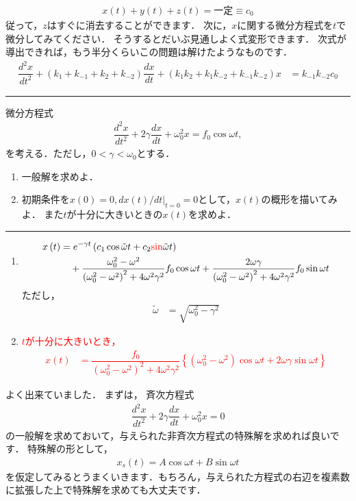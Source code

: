 \documentclass[11pt,a4]{jsarticle}
\numberwithin{equation}{section}
\begin{document}
\begin{align*}
  x(t) + y(t) + z(t) = 一定 \equiv c_0 
\end{align*}
従って，$z$はすぐに消去することができます．
次に，$x$に関する微分方程式を$t$で微分してみてください．
そうするとだいぶ見通しよく式変形できます．
次式が導出できれば，もう半分くらいこの問題は解けたようなものです．
\begin{align}
\dfrac{d^{2}x}{dt^{2}}+\left(k_{1}+k_{-1}+k_{2}+k_{-2}\right)\dfrac{dx}{dt}+\left(k_{1}k_{2}+k_{1}k_{-2}+k_{-1}k_{-2}\right)x & =k_{-1}k_{-2}c_{0}
\end{align}
%
\newpage
%
\hrule
\enshu
微分方程式
\begin{align*}
 \dfrac{d^2x}{dt^2} + 2\gamma \dfrac{dx}{dt} + \omega_{0}^{2}x = f_0 \cos \omega t, 
\end{align*}
を考える．ただし，$0< \gamma < \omega_{0}$とする．
\begin{enumerate}[(1)]
  \item 一般解を求めよ．
  \item 初期条件を$x(0)=0, d x(t)/dt|_{t=0}=0$として，$x(t)$の概形を描いてみよ．
	また$t$が十分に大きいときの$x(t)$を求めよ．
\end{enumerate}
%
\hrule
\vspace*{.2cm}
%
\begin{enumerate}[(1)]
 \item
\begin{align*}
 x\left(t\right) & =e^{-\gamma t}\left(c_{1}\cos\tilde{\omega}t+c_{2}\textcolor{red}{\sin}\tilde{\omega}t\right)\\
 & \quad+\dfrac{\omega_{0}^{2}-\omega^{2}}{\left(\omega_{0}^{2}-\omega^{2}\right)^{2}+4\omega^{2}\gamma^{2}}f_{0}\cos\omega t+\dfrac{2\omega\gamma}{\left(\omega_{0}^{2}-\omega^{2}\right)^{2}+4\omega^{2}\gamma^{2}}f_{0}\sin\omega t
\end{align*}
ただし，
\begin{align*}
 \tilde{\omega}&=\sqrt{\omega_{0}^{2}-\gamma^{2}}  
\end{align*}
%
\item

\textcolor{red}{
$t$が十分に大きいとき，
\begin{align*}
x\left(t\right) & =
 \dfrac{f_{0}}{\left(\omega_{0}^{2}-\omega^{2}\right)^{2}+4\omega^{2}\gamma^{2}}\left\{ \left(\omega_{0}^{2}-\omega^{2}\right)\cos\omega t+2\omega\gamma\sin\omega t\right\} 
\end{align*}
}
\end{enumerate}
%
%
\vspace*{1cm}
よく出来ていました．
まずは，
斉次方程式
\begin{align*}
 \dfrac{d^2 x}{dt^2} + 2\gamma \dfrac{dx}{dt} + \omega_0^2 x = 0  
\end{align*}
の一般解を求めておいて，与えられた非斉次方程式の特殊解を求めれば良いです．
特殊解の形として，
\begin{align*}
  x_s (t) = A\cos \omega t + B \sin \omega t 
\end{align*}
を仮定してみるとうまくいきます．もちろん，与えられた方程式の右辺を複素数に拡張した上で特殊解を求めても大丈夫です．
\end{document}
